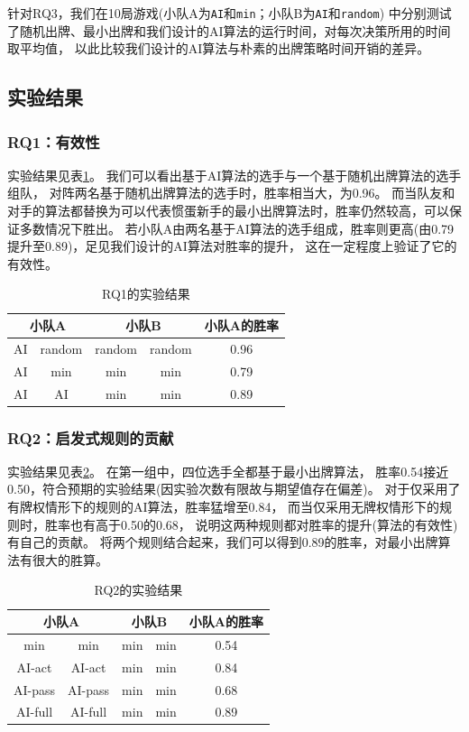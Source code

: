 \documentclass[a4paper]{ctexart}
\begin{document}
针对RQ3，我们在10局游戏(小队A为\texttt{AI}和\texttt{min}；小队B为\texttt{AI}和\texttt{random})
中分别测试了随机出牌、最小出牌和我们设计的AI算法的运行时间，对每次决策所用的时间取平均值，
以此比较我们设计的AI算法与朴素的出牌策略时间开销的差异。

\subsection{实验结果}

\subsubsection{RQ1：有效性}
实验结果见表\ref{RQ1_result}。
我们可以看出基于AI算法的选手与一个基于随机出牌算法的选手组队，
对阵两名基于随机出牌算法的选手时，胜率相当大，为0.96。
而当队友和对手的算法都替换为可以代表惯蛋新手的最小出牌算法时，胜率仍然较高，可以保证多数情况下胜出。
若小队A由两名基于AI算法的选手组成，胜率则更高(由0.79提升至0.89)，足见我们设计的AI算法对胜率的提升，
这在一定程度上验证了它的有效性。

\begin{table}
  \centering 
  \caption{RQ1的实验结果}
  \label{RQ1_result}
  \begin{tabular}{|c|c|c|c|c|}
    \hline
    \multicolumn{2}{|c|}{小队A} & \multicolumn{2}{c|}{小队B} & 小队A的胜率\\ \hline
    AI & random & random & random & 0.96 \\ \hline
    AI & min & min & min & 0.79 \\ \hline
    AI & AI & min & min & 0.89 \\ \hline
  \end{tabular}
\end{table}

\subsubsection{RQ2：启发式规则的贡献}
实验结果见表\ref{RQ2_result}。
在第一组中，四位选手全都基于最小出牌算法，
胜率0.54接近0.50，符合预期的实验结果(因实验次数有限故与期望值存在偏差)。
对于仅采用了有牌权情形下的规则的AI算法，胜率猛增至0.84，
而当仅采用无牌权情形下的规则时，胜率也有高于0.50的0.68，
说明这两种规则都对胜率的提升(算法的有效性)有自己的贡献。
将两个规则结合起来，我们可以得到0.89的胜率，对最小出牌算法有很大的胜算。

\begin{table}
  \centering 
  \caption{RQ2的实验结果}
  \label{RQ2_result}
  \begin{tabular}{|c|c|c|c|c|}
    \hline
    \multicolumn{2}{|c|}{小队A} & \multicolumn{2}{c|}{小队B} & 小队A的胜率 \\ \hline
    min & min & min & min & 0.54 \\ \hline
    AI-act  & AI-act & min & min & 0.84 \\ \hline
    AI-pass & AI-pass & min & min & 0.68 \\ \hline
    AI-full & AI-full & min & min & 0.89 \\ \hline
  \end{tabular}
\end{table}
\end{document}
